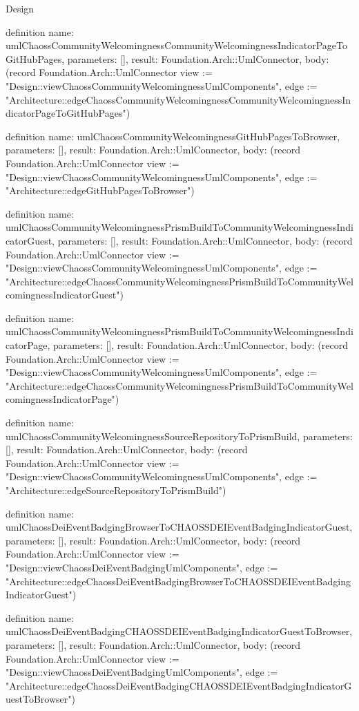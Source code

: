 \begin{lexlean}{Design}
\begin{semanticmodule}
definition{
  name: umlChaossCommunityWelcomingnessCommunityWelcomingnessIndicatorPageToGitHubPages,
  parameters: [],
  result: Foundation.Arch::UmlConnector,
  body: (record Foundation.Arch::UmlConnector {view := "Design::viewChaossCommunityWelcomingnessUmlComponents", edge := "Architecture::edgeChaossCommunityWelcomingnessCommunityWelcomingnessIndicatorPageToGitHubPages"})
}

definition{
  name: umlChaossCommunityWelcomingnessGitHubPagesToBrowser,
  parameters: [],
  result: Foundation.Arch::UmlConnector,
  body: (record Foundation.Arch::UmlConnector {view := "Design::viewChaossCommunityWelcomingnessUmlComponents", edge := "Architecture::edgeGitHubPagesToBrowser"})
}

definition{
  name: umlChaossCommunityWelcomingnessPrismBuildToCommunityWelcomingnessIndicatorGuest,
  parameters: [],
  result: Foundation.Arch::UmlConnector,
  body: (record Foundation.Arch::UmlConnector {view := "Design::viewChaossCommunityWelcomingnessUmlComponents", edge := "Architecture::edgeChaossCommunityWelcomingnessPrismBuildToCommunityWelcomingnessIndicatorGuest"})
}

definition{
  name: umlChaossCommunityWelcomingnessPrismBuildToCommunityWelcomingnessIndicatorPage,
  parameters: [],
  result: Foundation.Arch::UmlConnector,
  body: (record Foundation.Arch::UmlConnector {view := "Design::viewChaossCommunityWelcomingnessUmlComponents", edge := "Architecture::edgeChaossCommunityWelcomingnessPrismBuildToCommunityWelcomingnessIndicatorPage"})
}

definition{
  name: umlChaossCommunityWelcomingnessSourceRepositoryToPrismBuild,
  parameters: [],
  result: Foundation.Arch::UmlConnector,
  body: (record Foundation.Arch::UmlConnector {view := "Design::viewChaossCommunityWelcomingnessUmlComponents", edge := "Architecture::edgeSourceRepositoryToPrismBuild"})
}

definition{
  name: umlChaossDeiEventBadgingBrowserToCHAOSSDEIEventBadgingIndicatorGuest,
  parameters: [],
  result: Foundation.Arch::UmlConnector,
  body: (record Foundation.Arch::UmlConnector {view := "Design::viewChaossDeiEventBadgingUmlComponents", edge := "Architecture::edgeChaossDeiEventBadgingBrowserToCHAOSSDEIEventBadgingIndicatorGuest"})
}

definition{
  name: umlChaossDeiEventBadgingCHAOSSDEIEventBadgingIndicatorGuestToBrowser,
  parameters: [],
  result: Foundation.Arch::UmlConnector,
  body: (record Foundation.Arch::UmlConnector {view := "Design::viewChaossDeiEventBadgingUmlComponents", edge := "Architecture::edgeChaossDeiEventBadgingCHAOSSDEIEventBadgingIndicatorGuestToBrowser"})
}


\end{semanticmodule}
\end{lexlean}
